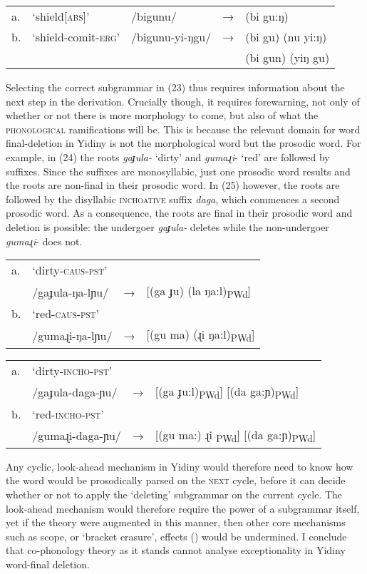 \documentclass[output=paper,
modfonts
]{LSP/langsci}
\begin{document}
\ea
\begin{tabular}[t]{@{}lllll}
a.& `shield\textsc{[abs]}' & /bigunu/ & → & (bi gu:ŋ) \\
b.& `shield-comit-\textsc{erg}' & /bigunu-yi-ŋgu/ & → & (bi gu) (nu yi:ŋ) \\
& & & &  \ljudge{*}(bi gun) (yiŋ gu) \\
\end{tabular}
\z 

Selecting the correct subgrammar in (23) thus requires information about the next step in the derivation. Crucially though, it requires forewarning, not only of whether or not there is more morphology to come, but also of what the \textsc{phonological} ramifications will be. This is because the relevant domain for word final-deletion in Yidiny is not the morphological word but the prosodic word. For example, in (24) the roots \textit{gaɟula-} `dirty' and \textit{gumaɻi}{}- `red' are followed by suffixes. Since the suffixes are monosyllabic, just one prosodic word results and the roots are non-final in their prosodic word. In (25) however, the roots are followed by the disyllabic \textsc{inchoative} suffix \textit{daga}, which commences a second prosodic word. As a consequence, the roots are final in their prosodic word and deletion is possible: the undergoer \textit{gaɟula-} deletes while the non-undergoer \textit{gumaɻi}- does not.

\ea 
\begin{tabular}[t]{@{}llll}
a. &`dirty\textsc{-caus-pst'} &&\\
& /gaɟula-ŋa-lɲu/ & → & [(ga ɟu) (la ŋa:l)\textsubscript{PWd}] \\
b.& `red\textsc{{}-caus-pst'}&&\\
& /gumaɻi-ŋa-lɲu/ & → & [(gu ma) (ɻi ŋa:l)\textsubscript{PWd}] \\
\end{tabular}

\ex
\begin{tabular}[t]{@{}llll}
a. &`dirty\textsc{-incho-pst}' &&\\
& /gaɟula-daga-ɲu/ & → & [(ga ɟu:l)\textsubscript{PWd}] [(da ga:ɲ)\textsubscript{PWd}] \\
b. &`red\textsc{-incho-pst}' &&\\
& /gumaɻi-daga-ɲu/ & → & [(gu ma:) ɻi\textsubscript{ PWd}] [(da ga:ɲ)\textsubscript{PWd}] 
\end{tabular}
\z

Any cyclic, look-ahead mechanism in Yidiny would therefore need to know how the word would be prosodically parsed on the \textsc{next} cycle, before it can decide whether or not to apply the `deleting' subgrammar on the current cycle. The look-ahead mechanism would therefore require the power of a subgrammar itself, yet if the theory were augmented in this manner, then other core mechanisms such as scope, or `bracket erasure', effects (\citealt{inkelas2007}) would be undermined. I conclude that co-phonology theory as it stands cannot analyse exceptionality in Yidiny word-final deletion.
\end{document}
